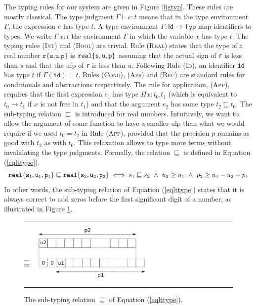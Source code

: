 The typing rules for our system are given in Figure \ref{figtyp}. These rules are mostly classical.
The type judgment $\Gamma\vdash e : t$ means that in the type environment $\Gamma$, the expression
$e$ has type $t$. A type environment $\Gamma : \mathsf{Id}\rightarrow\mathsf{Typ}$ map identifiers to types.
We write $\Gamma\ x:t$ the environment $\Gamma$ in which the variable $x$ has type $t$.
The typing rules \textsc{(Int)} and \textsc{(Bool)} are trivial. Rule \textsc{(Real)} states that
the type of a real number $\texttt{r\{s,u,p\}}$ is  $\mathtt{real\{s,u,p\}}$ assuming that the
actual sign of \texttt{r} is less than $s$ and that the \textsf{ufp} of \texttt{r} is less than $u$.
Following Rule \textsc{(Id)}, an identifier \texttt{id} has type $t$ if $\Gamma(\mathtt{id})=t$.
Rules \textsc{(Cond)}, \textsc{(Abs)} and \textsc{(Rec)} are standard rules for conditionals and abstractions respectively.
The rule for application, \textsc{(App)}, requires that the first expression $e_1$ has type
$\Pi x: t_0. t_1$ (which is equivalent to $t_0\rightarrow t_1$ if $x$ is not free in $t_1$)
and that the argument $e_2$ has some type $t_2\sqsubseteq t_0$. The sub-typing relation $\sqsubset$
is introduced for real numbers. Intuitively, we want to allow the argument of some function
to have a smaller \textsf{ulp} than what we would require if we used $t_0=t_2$ in Rule
\textsc{(App)}, provided that the precision $p$ remains as good with $t_2$ as with $t_0$.
This relaxation allows to type more terms without invalidating the type judgments.
Formally, the relation $\sqsubseteq$ is defined in Equation (\ref{eqlttype}).
\begin{equation}\label{eqlttype}
\F{s_1}{u_1}{p_1} \sqsubseteq \F{s_2}{u_2}{p_2} \iff s_1\sqsubseteq s_2\ \wedge\ u_2 \ge u_1\ \wedge\ p_2 \ge u_1 - u_2 + p_1
\end{equation}
In other words, the sub-typing relation of Equation (\ref{eqlttype}) states that it is
always correct to add zeros before the first significant digit of a number, as illustrated in
Figure \ref{figlt}.
 

\begin{figure}[tb]
  \begin{center}
\hrule
\vspace{0.1cm}
    \includegraphics[width=6.5cm]{lttype.pdf}
\vspace{0.1cm}
\hrule
    \caption{    \label{figlt}The sub-typing relation $\sqsubseteq$ of  Equation (\ref{eqlttype}).}
  \end{center}
\end{figure}

